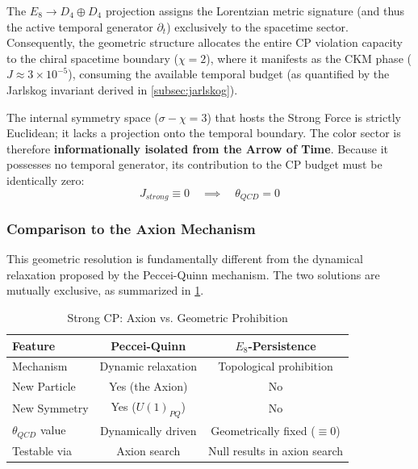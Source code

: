 The $E_8 \to D_4 \oplus D_4$ projection assigns the Lorentzian metric signature (and thus the active temporal generator $\partial_t$) exclusively to the spacetime sector. Consequently, the geometric structure allocates the entire CP violation capacity to the chiral spacetime boundary ($\chi=2$), where it manifests as the CKM phase ($J \approx 3 \times 10^{-5}$), consuming the available temporal budget (as quantified by the Jarlskog invariant derived in \cref{subsec:jarlskog}).

The internal symmetry space ($\sigma-\chi=3$) that hosts the Strong Force is strictly Euclidean; it lacks a projection onto the temporal boundary. The color sector is therefore \textbf{informationally isolated from the Arrow of Time}. Because it possesses no temporal generator, its contribution to the CP budget must be identically zero:
\begin{equation}
    J_{strong} \equiv 0 \quad \implies \quad \theta_{QCD} = 0
\end{equation}

\subsubsection{Comparison to the Axion Mechanism}
This geometric resolution is fundamentally different from the dynamical relaxation proposed by the Peccei-Quinn mechanism. The two solutions are mutually exclusive, as summarized in \cref{tab:cp_solutions}.

\begin{table}[htbp]
\centering
\caption{Strong CP: Axion vs. Geometric Prohibition}
\begin{tabular}{@{}lcc@{}}
\toprule
\textbf{Feature} & \textbf{Peccei-Quinn} & \textbf{$E_8$-Persistence} \\
\midrule
Mechanism & Dynamic relaxation & Topological prohibition \\
New Particle & Yes (the Axion) & No \\
New Symmetry & Yes ($U(1)_{PQ}$) & No \\
$\theta_{QCD}$ value & Dynamically driven & Geometrically fixed ($\equiv 0$) \\
Testable via & Axion search & Null results in axion search \\
\bottomrule
\end{tabular}
\label{tab:cp_solutions}
\end{table}

